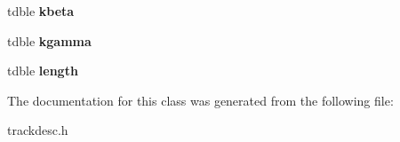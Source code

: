 \begin{DoxyCompactItemize}
\item 
\hypertarget{class_track_segment_adf041d240ff3c3c220e708cbb880d1d8}{tdble {\bfseries kbeta}}\label{class_track_segment_adf041d240ff3c3c220e708cbb880d1d8}

\item 
\hypertarget{class_track_segment_aad207293ed3d27bede0a7d5b549920a6}{tdble {\bfseries kgamma}}\label{class_track_segment_aad207293ed3d27bede0a7d5b549920a6}

\item 
\hypertarget{class_track_segment_a4c56bad12f14059cb259a035d2633204}{tdble {\bfseries length}}\label{class_track_segment_a4c56bad12f14059cb259a035d2633204}

\end{DoxyCompactItemize}


The documentation for this class was generated from the following file\-:\begin{DoxyCompactItemize}
\item 
trackdesc.\-h\end{DoxyCompactItemize}
